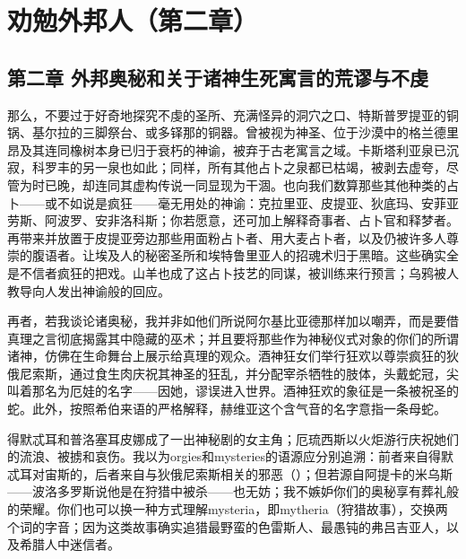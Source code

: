 

\section{劝勉外邦人（第二章）}

\par


\subsection{第二章  外邦奥秘和关于诸神生死寓言的荒谬与不虔}

那么，不要过于好奇地探究不虔的圣所、充满怪异的洞穴之口、特斯普罗提亚的铜锅、基尔拉的三脚祭台、或多铎那的铜器。曾被视为神圣、位于沙漠中的格兰德里昂及其连同橡树本身已归于衰朽的神谕，被弃于古老寓言之域。卡斯塔利亚泉已沉寂，科罗丰的另一泉也如此；同样，所有其他占卜之泉都已枯竭，被剥去虚夸，尽管为时已晚，却连同其虚构传说一同显现为干涸。也向我们数算那些其他种类的占卜——或不如说是疯狂——毫无用处的神谕：克拉里亚、皮提亚、狄底玛、安菲亚劳斯、阿波罗、安非洛科斯；你若愿意，还可加上解释奇事者、占卜官和释梦者。再带来并放置于皮提亚旁边那些用面粉占卜者、用大麦占卜者，以及仍被许多人尊崇的腹语者。让埃及人的秘密圣所和埃特鲁里亚人的招魂术归于黑暗。这些确实全是不信者疯狂的把戏。山羊也成了这占卜技艺的同谋，被训练来行预言；乌鸦被人教导向人发出神谕般的回应。\par

再者，若我谈论诸奥秘，我并非如他们所说阿尔基比亚德那样加以嘲弄，而是要借真理之言彻底揭露其中隐藏的巫术；并且要将那些作为神秘仪式对象的你们的所谓诸神，仿佛在生命舞台上展示给真理的观众。酒神狂女们举行狂欢以尊崇疯狂的狄俄尼索斯，通过食生肉庆祝其神圣的狂乱，并分配宰杀牺牲的肢体，头戴蛇冠，尖叫着那名为厄娃的名字——因她，谬误进入世界。酒神狂欢的象征是一条被祝圣的蛇。此外，按照希伯来语的严格解释，赫维亚这个含气音的名字意指一条母蛇。\par

得默忒耳和普洛塞耳皮娜成了一出神秘剧的女主角；厄琉西斯以火炬游行庆祝她们的流浪、被掳和哀伤。我以为orgies和mysteries的语源应分别追溯：前者来自得默忒耳对宙斯的，后者来自与狄俄尼索斯相关的邪恶（）；但若源自阿提卡的米乌斯——波洛多罗斯说他是在狩猎中被杀——也无妨；我不嫉妒你们的奥秘享有葬礼般的荣耀。你们也可以换一种方式理解mysteria，即mytheria（狩猎故事），交换两个词的字音；因为这类故事确实追猎最野蛮的色雷斯人、最愚钝的弗吕吉亚人，以及希腊人中迷信者。\par

